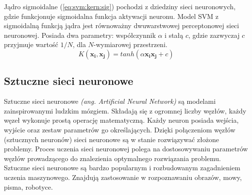 \documentclass[a4paper,12pt,twoside,openany]{report}
\newcommand{\ang}[1]{\textit{(ang. #1)}}
\newcommand{\Eq}[1]{(\ref{#1})}
\renewcommand{\vec}[1]{\bm{#1}}
\begin{document}
Jądro sigmoidalne \Eq{eq:svm:kern:sig} pochodzi z dziedziny sieci neuronowych,
gdzie funkcjonuje sigmoidalna funkcja aktywacji neuronu. 
Model SVM z sigmoidalną funkcją jądra jest równoważny dwuwarstwowej perceptonowej sieci neuronowej.
Posiada dwa parametry: współczynnik $\alpha$ i stałą $c$, gdzie zazwyczaj $c$ przyjmuje wartość $1/N$,
dla $N$-wymiarowej przestrzeni.
\begin{equation}
	\label{eq:svm:kern:sig}
	K(\vec{x_i}, \vec{x_j}) = tanh( \alpha \vec{x_i}  \vec{x_j} + c)
\end{equation}
\subsection{Sztuczne sieci neuronowe}
Sztuczne sieci neuronowe \ang{Artificial Neural Network} są modelami zainspirowanymi ludzkim mózgiem.
Składają się z ogromnej liczby węzłów, każdy węzeł wykonuje prostą operację matematyczną.
Każdy neuron posiada wejścia, wyjście oraz zestaw parametrów go określających. 
Dzięki połączeniom węzłów (sztucznych neuronów) sieci neuronowe są w stanie rozwiązywać złożone problemy.
Proces uczenia sieci neuronowej polega na dostosowywaniu parametrów węzłów prowadzącego do znalezienia optymalnego rozwiązania problemu.
Sztuczne sieci neuronowe są bardzo popularnym i rozbudowanym zagadnieniem uczenia maszynowego.
Znajdują zastosowanie w rozpoznawaniu obrazów, mowy, pisma, robotyce. 
\end{document}
